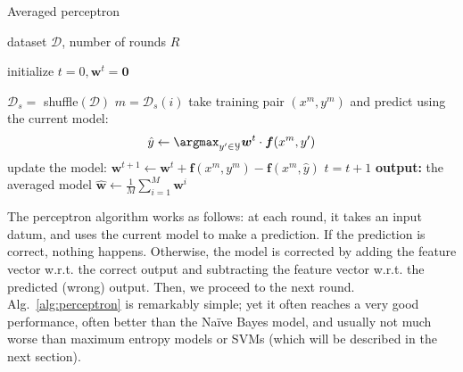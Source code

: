 \begin{algorithm}[t]

   \caption{\label{alg:perceptron} Averaged perceptron}

\begin{algorithmic}[1]

    dataset $\mathcal{D}$, number of rounds $R$

   \STATE initialize $t = 0, \boldsymbol{w}^t = \mathbf{0}$

         \STATE $\mathcal{D}_s =$ shuffle$(\mathcal{D})$
	\STATE $m = \mathcal{D}_s(i)$
	\STATE take training pair $(x^m, y^m)$ and predict using the current model: 
	$$\hat{y}  \leftarrow \argmax_{y'\in\mathcal{Y}} \boldsymbol{w}^t \cdot \boldsymbol{f}(x^m,y')$$
	\STATE update the model: 
	$\boldsymbol{w}^{t+1} \leftarrow \boldsymbol{w}^{t} +
        \boldsymbol{f}(x^m,y^m) - \boldsymbol{f}(x^m,\hat{y})$
        \STATE $t = t+1$
        \ENDFOR
	\ENDFOR
   \STATE \textbf{output:} the averaged model $\hat{\boldsymbol{w}} \leftarrow \frac{1}{M}\sum_{i=1}^{M} \boldsymbol{w}^{i}$

\end{algorithmic}
 
%
%
%
%
%

\end{algorithm}

The perceptron algorithm works as follows: at each round, it takes an input datum, and uses the current model 
to make a prediction. If the prediction is correct, nothing happens. 
Otherwise, the model is corrected by adding the feature vector w.r.t. the correct output and 
subtracting the  feature vector w.r.t. the predicted (wrong) output. Then, we proceed to the next round. 
Alg.~\ref{alg:perceptron} is remarkably simple; yet it often reaches a very good performance, 
often better than the Na\"ive Bayes model, and usually not much worse than maximum entropy models or SVMs (which will be 
described in the next section). 

